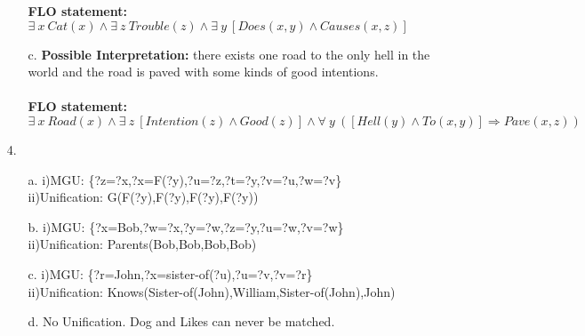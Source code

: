 \documentclass{article}
\begin{document}
\begin{titlepage}
\begin{enumerate}
\begin{enumerate}
                  \textbf{FLO statement:} \(\exists\ x \ Cat(x) \wedge \exists \ z \ Trouble(z)\wedge \exists\ y\ [Does(x,y)\wedge Causes(x,z)]\)\\
   		\item[c.]\textbf{Possible Interpretation: }there exists one road to the only hell in the world and the road is paved with some kinds of good intentions.\\\\
                  \textbf{FLO statement:} \(\exists \ x\ Road(x)\wedge \exists \ z \ [Intention(z)\wedge Good(z)]\wedge \forall \ y \ ([Hell(y)\wedge To(x,y)]\Rightarrow Pave(x,z) ) \)\\
   	\end{enumerate}
   	\item[4.]
   	\begin{enumerate}
   		\item[a.]i)MGU: \{?z=?x,?x=F(?y),?u=?z,?t=?y,?v=?u,?w=?v\}\\
                  ii)Unification: G(F(?y),F(?y),F(?y),F(?y))\\
   		\item[b.]i)MGU: \{?x=Bob,?w=?x,?y=?w,?z=?y,?u=?w,?v=?w\}\\
                  ii)Unification: Parents(Bob,Bob,Bob,Bob)\\
   		\item[c.]i)MGU: \{?r=John,?x=sister-of(?u),?u=?v,?v=?r\}\\
                  ii)Unification: Knows(Sister-of(John),William,Sister-of(John),John)\\
   		\item[d.] No Unification. Dog and Likes can never be matched. 
   	\end{enumerate}
   \end{enumerate}
\end{titlepage}
\end{document}
